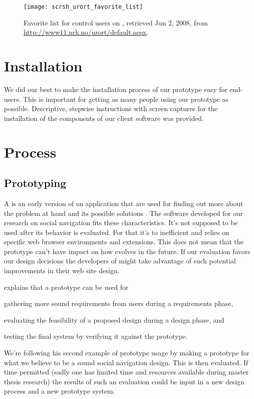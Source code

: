 \begin{figure}
  \texttt{[image: scrsh\_urort\_favorite\_list]}
  \caption[\urort{} Favorite List]{
    Favorite list for control users on \urort{},
    retrieved Jun 2, 2008, from
    \url{http://www11.nrk.no/urort/default.aspx}.
  }
  \label{figure:scrsh.urort.favorite.list}
\end{figure}

\section{Installation}

We did our best to make the installation process of our prototype easy
for end-users. This is important for getting as many people using our
prototype as possible.
Descriptive, stepwise instructions with screen captures for the installation of
the components of our client software was provided.

\section{Process}

\subsection{Prototyping}

A  is an early version of an application that are used for
finding out more about the problem at hand and its possible solutions
\citep[]{sommerville06}.
The software developed for our research on social navigation fits these
characteristics. It's not supposed to be used after its behavior is
evaluated. For that it's to inefficient and relies on specific web browser
environments and extensions. This does not mean that the prototype can't have
impact on how \urort{} evolves in the future. If our evaluation favors our
design decisions the developers of \urort{} might take advantage of such
potential improvements in their web site design.

\citet[]{sommerville06} explains that a prototype can be used for
\begin{inparaenum}[(i)]
  \item gathering more sound requirements from users during a
    requirements phase,
  \item evaluating the feasibility of a proposed design during a
    design phase, and
  \item testing the final system by verifying it against the prototype.
\end{inparaenum}
We're following his second example of prototype usage by making a prototype
for what we believe to be a sound social navigation design. This is then
evaluated. If time permitted (sadly one has limited time and resources
available during master thesis research) the results of such an evaluation
could be input in a new design process and a new prototype system.

